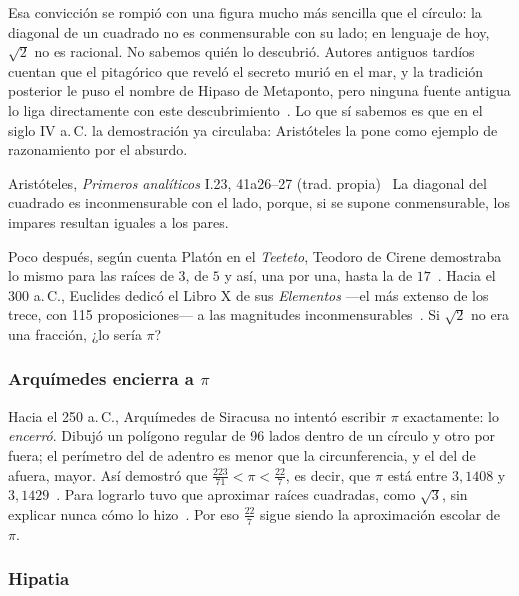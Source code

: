 \documentclass[11pt]{article}
\begin{document}
Esa convicción se rompió con una figura mucho más sencilla que el círculo:
la diagonal de un cuadrado no es conmensurable con su lado; en lenguaje de
hoy, $\sqrt{2}$ no es racional. No sabemos quién lo descubrió. Autores
antiguos tardíos cuentan que el pitagórico que reveló el secreto murió en el
mar, y la tradición posterior le puso el nombre de Hipaso de Metaponto, pero
ninguna fuente antigua lo liga directamente con este
descubrimiento~\cite{huffman}. Lo que sí sabemos es que en el siglo IV
a.\,C. la demostración ya circulaba: Aristóteles la pone como ejemplo de
razonamiento por el absurdo.

\begin{cita}{Aristóteles, \emph{Primeros analíticos} I.23, 41a26--27 (trad. propia)~\cite{corry}}
La diagonal del cuadrado es inconmensurable con el lado, porque, si se
supone conmensurable, los impares resultan iguales a los pares.
\end{cita}

Poco después, según cuenta Platón en el \emph{Teeteto}, Teodoro de Cirene
demostraba lo mismo para las raíces de $3$, de $5$ y así, una por una, hasta
la de $17$~\cite{mactutortheodorus}. Hacia el 300 a.\,C., Euclides dedicó el
Libro X de sus \emph{Elementos} —el más extenso de los trece, con 115
proposiciones— a las magnitudes inconmensurables~\cite{euclides}. Si
$\sqrt{2}$ no era una fracción, ¿lo sería $\pi$?

\subsubsection*{Arquímedes encierra a $\pi$}

Hacia el 250 a.\,C., Arquímedes de Siracusa no intentó escribir $\pi$
exactamente: lo \emph{encerró}. Dibujó un polígono regular de 96 lados
dentro de un círculo y otro por fuera; el perímetro del de adentro es menor
que la circunferencia, y el del de afuera, mayor. Así demostró que
$\frac{223}{71} < \pi < \frac{22}{7}$, es decir, que $\pi$ está entre
$3{,}1408$ y $3{,}1429$~\cite{mactutorpi}. Para lograrlo tuvo que aproximar
raíces cuadradas, como $\sqrt{3}$, sin explicar nunca cómo lo
hizo~\cite{arqraices}. Por eso $\frac{22}{7}$ sigue siendo la aproximación
escolar de $\pi$.

\subsubsection*{Hipatia}
\end{document}
